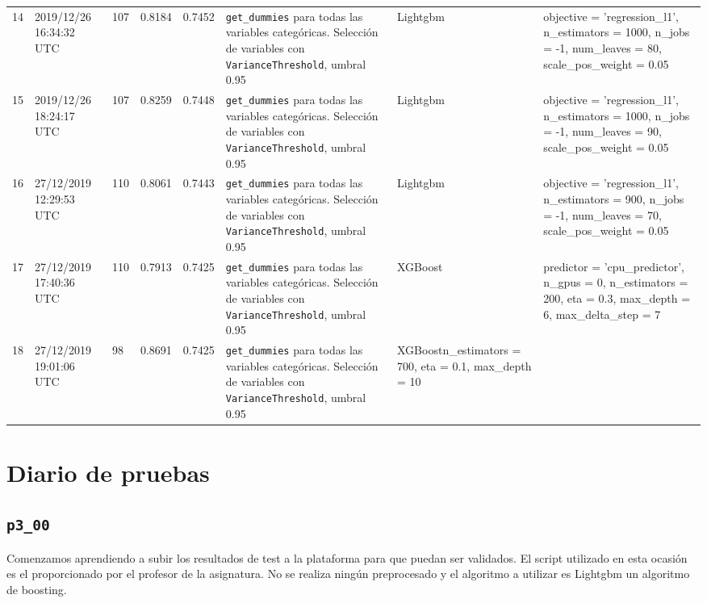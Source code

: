 \documentclass[a4paper, 20pt]{article}
\begin{document}
\begin{longtable}{lL{2cm}lllL{3cm}L{2.5cm}L{3.5cm}}
14 & 2019/12/26 16:34:32 UTC & 107 & 0.8184 & 0.7452 & \texttt{get\_dummies} para todas las variables categóricas. Selección de variables con \texttt{VarianceThreshold}, umbral 0.95 & Lightgbm & {\ttfamily objective = 'regression\_l1', n\_estimators = 1000, n\_jobs = -1, num\_leaves = 80, scale\_pos\_weight = 0.05}\\

15 & 2019/12/26 18:24:17 UTC & 107 & 0.8259 & 0.7448 &\texttt{get\_dummies} para todas las variables categóricas. Selección de variables con \texttt{VarianceThreshold}, umbral 0.95 & Lightgbm & {\ttfamily objective = 'regression\_l1', n\_estimators = 1000, n\_jobs = -1, num\_leaves = 90, scale\_pos\_weight = 0.05}\\

16 & 27/12/2019 12:29:53 UTC & 110 & 0.8061 & 0.7443 & \texttt{get\_dummies} para todas las variables categóricas. Selección de variables con \texttt{VarianceThreshold}, umbral 0.95 & Lightgbm & {\ttfamily objective = 'regression\_l1', n\_estimators = 900, n\_jobs = -1, num\_leaves = 70, scale\_pos\_weight = 0.05}\\

17 & 27/12/2019 17:40:36 UTC & 110 & 0.7913 & 0.7425  & \texttt{get\_dummies} para todas las variables categóricas. Selección de variables con \texttt{VarianceThreshold}, umbral 0.95 & XGBoost & {\ttfamily predictor = 'cpu\_predictor', n\_gpus = 0, n\_estimators = 200, eta = 0.3, max\_depth = 6, max\_delta\_step = 7}\\

18 & 27/12/2019 19:01:06 UTC & 98 & 0.8691 & 0.7425 & \texttt{get\_dummies} para todas las variables categóricas. Selección de variables con \texttt{VarianceThreshold}, umbral 0.95 & XGBoost{\ttfamily n\_estimators = 700, eta = 0.1, max\_depth = 10}\\
\bottomrule
\end{longtable}
\newpage

\section{Diario de pruebas}
\subsection{\texttt{p3\_00}}
Comenzamos aprendiendo a subir los resultados de test a la plataforma para que puedan ser validados. El script utilizado en esta ocasión es el proporcionado por el profesor de la asignatura. No se realiza ningún preprocesado y el algoritmo a utilizar es Lightgbm un algoritmo de boosting.
\end{document}
